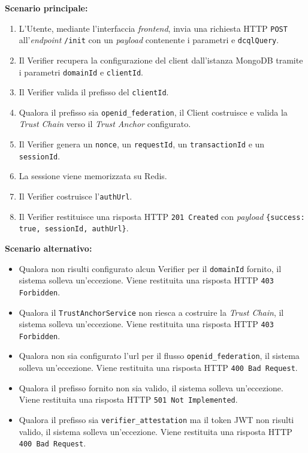 \noindent\textbf{Scenario principale:}
\begin{enumerate}
    \item L'Utente, mediante l'interfaccia \textit{frontend}, invia una richiesta HTTP \texttt{POST} all'\textit{endpoint} \texttt{/init} con un \textit{payload} contenente i parametri e \texttt{dcqlQuery}.
    \item Il Verifier recupera la configurazione del client dall'istanza MongoDB tramite i parametri \texttt{domainId} e \texttt{clientId}.
    \item Il Verifier valida il prefisso del \texttt{clientId}.
    \item Qualora il prefisso sia \texttt{openid\_\allowbreak{}federation}, il Client costruisce e valida la \textit{Trust Chain} verso il \textit{Trust Anchor} configurato.
    \item Il Verifier genera un \texttt{nonce}, un \texttt{requestId}, un \texttt{transactionId} e un \texttt{sessionId}.
    \item La sessione viene memorizzata su Redis.
    \item Il Verifier costruisce l'\texttt{authUrl}.
    \item Il Verifier restituisce una risposta HTTP \texttt{201 Created} con \textit{payload} \texttt{\{success: true, sessionId, authUrl\}}.
\end{enumerate}

\noindent\textbf{Scenario alternativo:}
\begin{itemize}
    \item Qualora non risulti configurato alcun Verifier per il \texttt{domainId} fornito, il sistema solleva un'eccezione. Viene restituita una risposta HTTP \texttt{403 Forbidden}.
    \item Qualora il \texttt{TrustAnchorService} non riesca a costruire la \textit{Trust Chain}, il sistema solleva un'eccezione. Viene restituita una risposta HTTP \texttt{403 Forbidden}.
    \item Qualora non sia configurato l'url per il flusso \texttt{openid\_\allowbreak{}federation}, il sistema solleva un'eccezione. Viene restituita una risposta HTTP \texttt{400 Bad Request}.
    \item Qualora il prefisso fornito non sia valido, il sistema solleva un'eccezione. Viene restituita una risposta HTTP \texttt{501 Not Implemented}.
    \item Qualora il prefisso sia \texttt{verifier\_\allowbreak{}attestation} ma il token JWT non risulti valido, il sistema solleva un'eccezione. Viene restituita una risposta HTTP \texttt{400 Bad Request}.
\end{itemize}

